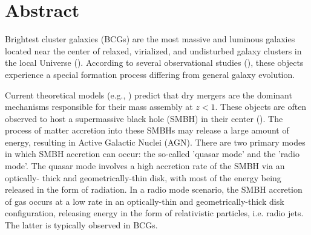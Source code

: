 \chapter*{Abstract}


Brightest cluster galaxies (BCGs) are the most massive and luminous galaxies
located near the center of relaxed, virialized, and undisturbed galaxy clusters in the local Universe
(\cite{1976ApJ...205..688S, 2010MNRAS.404.1231V}). According to several observational studies
(\cite{2017MNRAS.467.4101G, 2020MNRAS.498.2719T}), these objects experience a special formation
process differing from general galaxy evolution.

Current theoretical models (e.g., \cite{2007MNRAS.375....2D, 2019ApJ...881..150C}) predict that dry
mergers are the dominant mechanisms responsible for their mass assembly at $z < 1$. These
objects are often observed to host a supermassive black hole (SMBH) in their center (\cite{2006ApJ...652..216R}).
The process of matter accretion into these SMBHs may release a large amount of
energy, resulting in Active Galactic Nuclei (AGN). There are two primary modes in which SMBH
accretion can occur: the so-called ’quasar mode’ and the ’radio mode’. The quasar mode involves
a high accretion rate of the SMBH via an optically- thick and geometrically-thin disk, with most of
the energy being released in the form of radiation. In a radio mode scenario, the SMBH accretion
of gas occurs at a low rate in an optically-thin and geometrically-thick disk configuration,
releasing energy in the form of relativistic particles, i.e. radio jets. The latter is typically observed in
BCGs.

